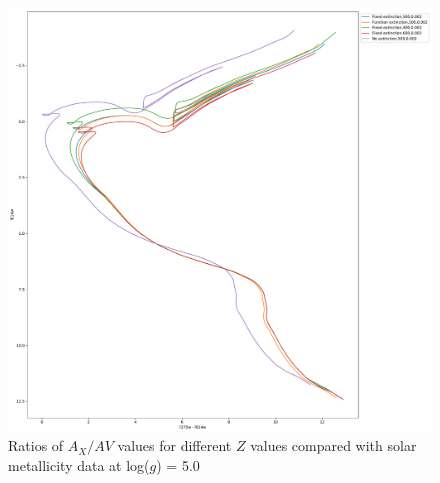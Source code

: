 \documentclass[12pt, a4paper]{report}
\begin{document}
\begin{figure}[h]
\begin{center}
\includegraphics[scale=0.3]{../basti_isochrones_10_13Gyr/Extinction_T5k_FeH0fix_func_f814w_f275wmf814w_500_400_600_Myr_FeH_0p002_ref_noext_Av_1p0.pdf}
\caption{Ratios of $A_{X}/A{V}$ values for different $Z$ values compared with solar metallicity data at log($g$) = 5.0}
\label{wfc3_isoc2_T5k}
\end{center}
\end{figure}
\end{document}
